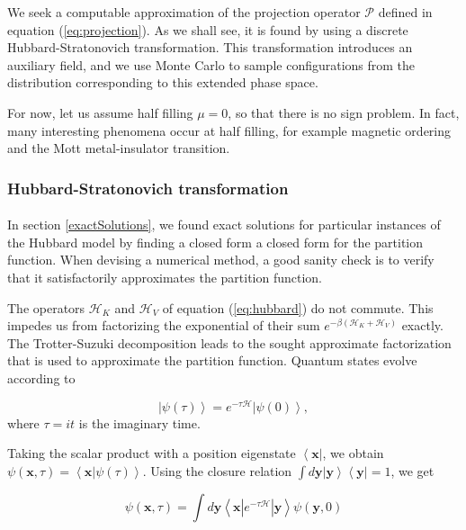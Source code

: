 \documentclass[10pt, twocolumn, twoside]{article}
\begin{document}
We seek a computable approximation of the projection operator $\mathcal{P}$ defined in equation (\ref{eq:projection}). As we shall see, it is found by using a discrete Hubbard-Stratonovich transformation. This transformation introduces an auxiliary field, and we use Monte Carlo to sample configurations from the distribution corresponding to this extended phase space.

For now, let us assume half filling $\mu = 0$, so that there is no sign problem. In fact, many interesting phenomena occur at half filling, for example magnetic ordering and the Mott metal-insulator transition.

\subsubsection{Hubbard-Stratonovich transformation}\paragraph{}

In section \ref{exactSolutions}, we found exact solutions for particular instances of the Hubbard model by finding a closed form a closed form for the partition function. When devising a numerical method, a good sanity check is to verify that it satisfactorily approximates the partition function.

The operators $\mathcal{H}_K$ and $\mathcal{H}_V$ of equation (\ref{eq:hubbard}) do not commute. This impedes us from factorizing the exponential of their sum $e^{-\beta (\mathcal{H}_K + \mathcal{H}_V)}$ exactly. The Trotter-Suzuki decomposition leads to the sought approximate factorization that is used to approximate the partition function. Quantum states evolve according to

\begin{equation}
\left| \psi (\tau) \right\rangle = e^{-\tau \mathcal{H} } \left| \psi (0) \right\rangle ,
\end{equation}
where $\tau = it$ is the imaginary time.

Taking the scalar product with a position eigenstate $ \left\langle \bm x \right|$, we obtain $\psi (\bm x, \tau) = \left\langle \bm x | \psi (\tau) \right\rangle$. Using the closure relation $\int d\bm y \left| \bm y \right\rangle  \left\langle \bm y \right| = 1$, we get

\begin{equation}
\psi ( \bm x , \tau ) = \int d\bm y \left\langle \bm x | e^{-\tau \mathcal{H}} | \bm y \right\rangle \psi (\bm y, 0)
\end{equation}
\end{document}
